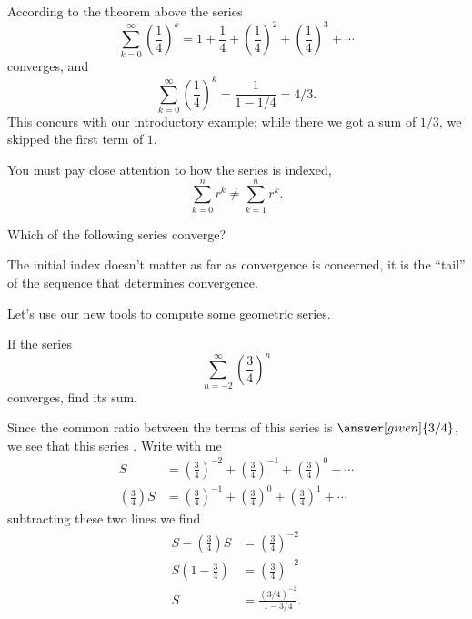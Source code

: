\documentclass{ximera}
\begin{document}
According to the theorem above the series
\[
\sum_{k=0}^\infty \left(\frac{1}{4}\right)^k = 1 + \frac{1}{4} + \left(\frac{1}{4}\right)^2 + \left(\frac{1}{4}\right)^3 + \cdots
\]
converges, and
\[
\sum_{k=0}^\infty  \left(\frac{1}{4}\right)^k = \frac{1}{1-1/4} = 4/3.
\]
This concurs with our introductory example; while there we got a sum
of $1/3$, we skipped the first term of $1$.

\begin{warning}
  You must pay close attention to how the series is indexed,
  \[
  \sum_{k=0}^n r^k \ne \sum_{k=1}^n r^k.
  \]
\end{warning}


\begin{question}
  Which of the following series converge?
  \begin{selectAll}
  \end{selectAll}
  \begin{hint}
    The initial index doesn't matter as far as convergence is
    concerned, it is the ``tail'' of the sequence that determines
    convergence.
  \end{hint}
\end{question}

Let's use our new tools to compute some geometric series.

\begin{example}
If the series 
\[
\sum_{n=-2}^\infty \left(\frac{3}{4}\right)^n
\]
converges, find its sum.
\begin{explanation}
Since the common ratio between the terms of this series is
$\answer[given]{3/4}$, we see that this series
. Write with me
\begin{align*}
  S &= \left(\frac{3}{4}\right)^{-2} + \left(\frac{3}{4}\right)^{-1} + \left(\frac{3}{4}\right)^{0} + \cdots\\
  \left(\frac{3}{4}\right) S &= \left(\frac{3}{4}\right)^{-1} + \left(\frac{3}{4}\right)^{0} + \left(\frac{3}{4}\right)^{1} + \cdots
\end{align*}
subtracting these two lines we find
\begin{align*}
  S -  \left(\frac{3}{4}\right) S  &= \left(\frac{3}{4}\right)^{-2}\\
  S\left(1-\frac{3}{4}\right) &= \left(\frac{3}{4}\right)^{-2}\\
  S &= \frac{(3/4)^{-2}}{1-3/4}.
\end{align*}
\end{explanation}
\end{example}
\end{document}
